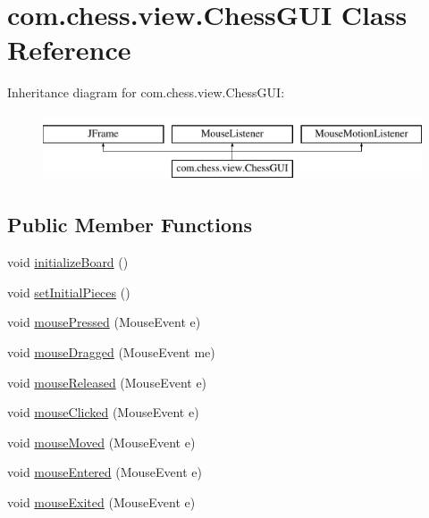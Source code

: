 \hypertarget{classcom_1_1chess_1_1view_1_1_chess_g_u_i}{}\section{com.\+chess.\+view.\+Chess\+G\+UI Class Reference}
\label{classcom_1_1chess_1_1view_1_1_chess_g_u_i}
Inheritance diagram for com.\+chess.\+view.\+Chess\+G\+UI\+:\begin{figure}[H]
\begin{center}
\leavevmode
\includegraphics[height=2.000000cm]{classcom_1_1chess_1_1view_1_1_chess_g_u_i}
\end{center}
\end{figure}
\subsection*{Public Member Functions}
\begin{DoxyCompactItemize}
\item 
void \mbox{\hyperlink{classcom_1_1chess_1_1view_1_1_chess_g_u_i_a2f0543abc396f39d74f5cf1dab9f8190}{initialize\+Board}} ()
\item 
void \mbox{\hyperlink{classcom_1_1chess_1_1view_1_1_chess_g_u_i_a2aece728fcd078b07955640001b4225a}{set\+Initial\+Pieces}} ()
\item 
void \mbox{\hyperlink{classcom_1_1chess_1_1view_1_1_chess_g_u_i_a6b8f933ba8c5a123e657cda27a65f002}{mouse\+Pressed}} (Mouse\+Event e)
\item 
void \mbox{\hyperlink{classcom_1_1chess_1_1view_1_1_chess_g_u_i_a002bd2e01122699446902657c9cb997c}{mouse\+Dragged}} (Mouse\+Event me)
\item 
void \mbox{\hyperlink{classcom_1_1chess_1_1view_1_1_chess_g_u_i_aaf67b922a837026667e5c11813e31c5a}{mouse\+Released}} (Mouse\+Event e)
\item 
void \mbox{\hyperlink{classcom_1_1chess_1_1view_1_1_chess_g_u_i_a8fa12c602e2d16178210cba60639bae4}{mouse\+Clicked}} (Mouse\+Event e)
\item 
void \mbox{\hyperlink{classcom_1_1chess_1_1view_1_1_chess_g_u_i_ac2ec94c0dbe6831ce479ab41ea033482}{mouse\+Moved}} (Mouse\+Event e)
\item 
void \mbox{\hyperlink{classcom_1_1chess_1_1view_1_1_chess_g_u_i_aedfd25c21b3fa55cff7f39adabdf0d89}{mouse\+Entered}} (Mouse\+Event e)
\item 
void \mbox{\hyperlink{classcom_1_1chess_1_1view_1_1_chess_g_u_i_a6b53399740ed140b33b2db9cbba3d0c7}{mouse\+Exited}} (Mouse\+Event e)
\end{DoxyCompactItemize}
